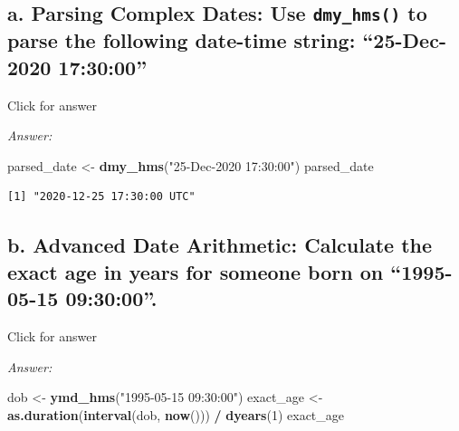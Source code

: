 \documentclass[
]{book}
\newenvironment{Shaded}{\begin{snugshade}}{\end{snugshade}}
\newcommand{\DecValTok}[1]{\textcolor[rgb]{0.00,0.00,0.81}{#1}}
\newcommand{\FunctionTok}[1]{\textcolor[rgb]{0.13,0.29,0.53}{\textbf{#1}}}
\newcommand{\NormalTok}[1]{#1}
\newcommand{\OtherTok}[1]{\textcolor[rgb]{0.56,0.35,0.01}{#1}}
\newcommand{\SpecialCharTok}[1]{\textcolor[rgb]{0.81,0.36,0.00}{\textbf{#1}}}
\newcommand{\StringTok}[1]{\textcolor[rgb]{0.31,0.60,0.02}{#1}}
\begin{document}
\hypertarget{a.-parsing-complex-dates-use-dmy_hms-to-parse-the-following-date-time-string-25-dec-2020-173000}{%
\subsection{\texorpdfstring{a. Parsing Complex Dates: Use \texttt{dmy\_hms()} to parse the following date-time string: ``25-Dec-2020 17:30:00''}{a. Parsing Complex Dates: Use dmy\_hms() to parse the following date-time string: ``25-Dec-2020 17:30:00''}}\label{a.-parsing-complex-dates-use-dmy_hms-to-parse-the-following-date-time-string-25-dec-2020-173000}}

Click for answer

\emph{Answer:}

\begin{Shaded}
\begin{Highlighting}[]
\NormalTok{parsed\_date }\OtherTok{\textless{}{-}} \FunctionTok{dmy\_hms}\NormalTok{(}\StringTok{"25{-}Dec{-}2020 17:30:00"}\NormalTok{)}
\NormalTok{parsed\_date}
\end{Highlighting}
\end{Shaded}

\begin{verbatim}
[1] "2020-12-25 17:30:00 UTC"
\end{verbatim}

\hypertarget{b.-advanced-date-arithmetic-calculate-the-exact-age-in-years-for-someone-born-on-1995-05-15-093000.}{%
\subsection{b. Advanced Date Arithmetic: Calculate the exact age in years for someone born on ``1995-05-15 09:30:00''.}\label{b.-advanced-date-arithmetic-calculate-the-exact-age-in-years-for-someone-born-on-1995-05-15-093000.}}

Click for answer

\emph{Answer:}

\begin{Shaded}
\begin{Highlighting}[]
\NormalTok{dob }\OtherTok{\textless{}{-}} \FunctionTok{ymd\_hms}\NormalTok{(}\StringTok{"1995{-}05{-}15 09:30:00"}\NormalTok{)}
\NormalTok{exact\_age }\OtherTok{\textless{}{-}} \FunctionTok{as.duration}\NormalTok{(}\FunctionTok{interval}\NormalTok{(dob, }\FunctionTok{now}\NormalTok{())) }\SpecialCharTok{/} \FunctionTok{dyears}\NormalTok{(}\DecValTok{1}\NormalTok{)}
\NormalTok{exact\_age}
\end{Highlighting}
\end{Shaded}
\end{document}
